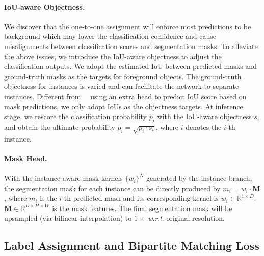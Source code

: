 \documentclass[10pt,twocolumn,letterpaper]{article}
\renewcommand{\wrt}{\textit{w}.\textit{r}.\textit{t}. }
\begin{document}
\paragraph{IoU-aware Objectness.}
\label{iou_objectness}
We discover that the one-to-one assignment will enforce most predictions to be background which may lower the classification confidence and cause misalignments between classification scores and segmentation masks.
To alleviate the above issues, we introduce the IoU-aware objectness to adjust the classification outputs.
We adopt the estimated IoU between predicted masks and ground-truth masks as the targets for foreground objects.
The ground-truth objectness for instances is varied and can facilitate the network to separate instances.
Different from ~\cite{MSRCNNHuangHGHW19}~using an extra head to predict IoU score based on mask predictions, we only adopt IoUs as the objectness targets.
At inference stage, we rescore the classification probability $p_i$ with the IoU-aware objectness $s_i$ and obtain the ultimate probability $\tilde{p_i} = \sqrt{p_i\cdot s_i}$, where $i$ denotes the $i$-th instance.

\paragraph{Mask Head.}
With the instance-aware mask kernels $\{w_i\}^N$ generated by the instance branch, the segmentation mask for each instance can be directly produced by $m_i = w_i\cdot \mathbf{M}$, where $m_i$ is the $i$-th predicted mask and its corresponding kernel is $w_i \in \mathbb{R}^{1\times D}$. $\mathbf{M} \in \mathbb{R}^{D\times H\times W}$ is the mask features. The final segmentation mask will be upsampled (via bilinear interpolation) to $1\times$ \wrt original resolution.



\subsection{Label Assignment and Bipartite Matching Loss}
\end{document}
